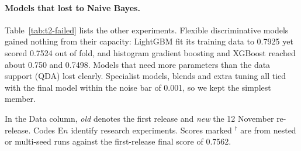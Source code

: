\documentclass[../main.tex]{subfiles}
\begin{document}
\paragraph{Models that lost to Naive Bayes.} Table~\ref{tab:t2-failed} lists the other experiments. Flexible discriminative models gained nothing from their capacity: LightGBM \citep{lightgbm} fit its training data to 0.7925 yet scored 0.7524 out of fold, and histogram gradient boosting and XGBoost \citep{xgboost} reached about 0.750 and 0.7498. Models that need more parameters than the data support (QDA) lost clearly. Specialist models, blends and extra tuning all tied with the final model within the noise bar of 0.001, so we kept the simplest member.

In the Data column, \emph{old} denotes the first release and \emph{new} the 12 November re-release. Codes E$n$ identify research experiments. Scores marked $^\dagger$ are from nested or multi-seed runs against the first-release final score of 0.7562.
\end{document}
